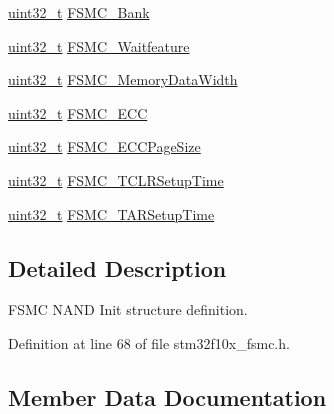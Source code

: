 \begin{DoxyCompactItemize}
\item 
\hyperlink{_p_e___types_8h_a33594304e786b158f3fb30289278f5af}{uint32\+\_\+t} \hyperlink{struct_f_s_m_c___n_a_n_d_init_type_def_a60d3ead2188e1dbdf06810e952b3ce0f}{F\+S\+M\+C\+\_\+\+Bank}
\item 
\hyperlink{_p_e___types_8h_a33594304e786b158f3fb30289278f5af}{uint32\+\_\+t} \hyperlink{struct_f_s_m_c___n_a_n_d_init_type_def_ab350e15014c4a9f4b2c2f2848f11eeca}{F\+S\+M\+C\+\_\+\+Waitfeature}
\item 
\hyperlink{_p_e___types_8h_a33594304e786b158f3fb30289278f5af}{uint32\+\_\+t} \hyperlink{struct_f_s_m_c___n_a_n_d_init_type_def_ab4a4f56aab3150d8fb02aaf092db0235}{F\+S\+M\+C\+\_\+\+Memory\+Data\+Width}
\item 
\hyperlink{_p_e___types_8h_a33594304e786b158f3fb30289278f5af}{uint32\+\_\+t} \hyperlink{struct_f_s_m_c___n_a_n_d_init_type_def_a58d0510c0ce0ae3d1e3863bf8f571377}{F\+S\+M\+C\+\_\+\+E\+CC}
\item 
\hyperlink{_p_e___types_8h_a33594304e786b158f3fb30289278f5af}{uint32\+\_\+t} \hyperlink{struct_f_s_m_c___n_a_n_d_init_type_def_a7ed6a25710ba724a7a8f90af60130cf6}{F\+S\+M\+C\+\_\+\+E\+C\+C\+Page\+Size}
\item 
\hyperlink{_p_e___types_8h_a33594304e786b158f3fb30289278f5af}{uint32\+\_\+t} \hyperlink{struct_f_s_m_c___n_a_n_d_init_type_def_a633c7be46a1d281916b9f2e34fa3d36a}{F\+S\+M\+C\+\_\+\+T\+C\+L\+R\+Setup\+Time}
\item 
\hyperlink{_p_e___types_8h_a33594304e786b158f3fb30289278f5af}{uint32\+\_\+t} \hyperlink{struct_f_s_m_c___n_a_n_d_init_type_def_a014c1b8977b454ac15654d93dbb7dff9}{F\+S\+M\+C\+\_\+\+T\+A\+R\+Setup\+Time}
\end{DoxyCompactItemize}


\subsection{Detailed Description}
F\+S\+MC N\+A\+ND Init structure definition. 

Definition at line 68 of file stm32f10x\+\_\+fsmc.\+h.



\subsection{Member Data Documentation}
